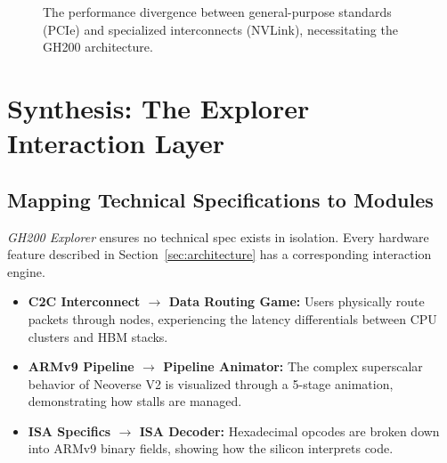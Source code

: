 \documentclass[12pt, a4paper]{article}
\begin{document}
\begin{figure}[H]
\centering
{}
\caption{The performance divergence between general-purpose standards (PCIe) and specialized interconnects (NVLink), necessitating the GH200 architecture.}
\end{figure}

\section{Synthesis: The Explorer Interaction Layer}
\label{sec:explorer}

\subsection{Mapping Technical Specifications to Modules}

\textit{GH200 Explorer} ensures no technical spec exists in isolation. Every hardware feature described in Section~\ref{sec:architecture} has a corresponding interaction engine.

\begin{itemize}
  \item \textbf{C2C Interconnect $\rightarrow$ Data Routing Game:} Users physically route packets through nodes, experiencing the latency differentials between CPU clusters and HBM stacks.
  \item \textbf{ARMv9 Pipeline $\rightarrow$ Pipeline Animator:} The complex superscalar behavior of Neoverse V2 is visualized through a 5-stage animation, demonstrating how stalls are managed.
  \item \textbf{ISA Specifics $\rightarrow$ ISA Decoder:} Hexadecimal opcodes are broken down into ARMv9 binary fields, showing how the silicon interprets code.
\end{itemize}
\end{document}
